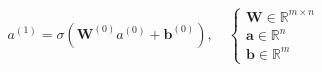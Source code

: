 %
\begin{equation}
    {a^{(1)}} = \sigma \left(
        \mathbf{W}^{(0)} {a^{(0)}}+\mathbf{b}^{(0)}
    \right), \quad
    \begin{cases*}
        \mathbf{W} \in \mathbb{R}^{m\times n} \\
        \mathbf{a} \in \mathbb{R}^{n} \\
        \mathbf{b} \in \mathbb{R}^{m}
    \end{cases*}
    \label{eq:ANN_variable}
\end{equation}

